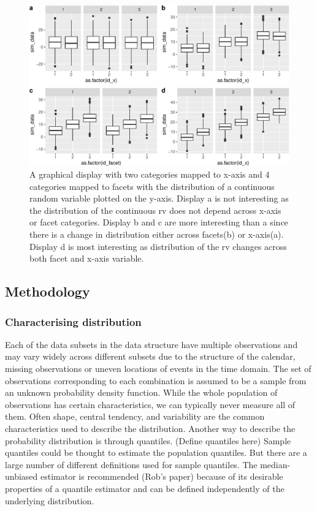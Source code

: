 \documentclass[
]{article}
\begin{document}
\begin{figure}

{\centering \includegraphics[width=\textwidth]{figure/null4by2-1} 

}

\caption{ A graphical display with two categories mapped to x-axis and 4 categories mapped to facets with the distribution of a continuous random variable plotted on the y-axis. Display a is not interesting as the distribution of the continuous rv does not depend across x-axis or facet categories. Display b and c are more interesting than a since there is a change in distribution either across facets(b) or x-axis(a). Display d is most interesting as distribution of the rv changes across both facet and x-axis variable.}\label{fig:null4by2}
\end{figure}

\hypertarget{methodology}{%
\subsection{Methodology}\label{methodology}}

\hypertarget{characterising-distribution}{%
\subsubsection{Characterising distribution}\label{characterising-distribution}}

Each of the data subsets in the data structure have multiple observations and may vary widely across different subsets due to the structure of the calendar, missing observations or uneven locations of events in the time domain. The set of observations corresponding to each combination is assumed to be a sample from an unknown probability density function.
While the whole population of observations has certain characteristics, we can typically never measure all of them. Often shape, central tendency, and variability are the common characteristics used to describe the distribution. Another way to describe the probability distribution is through quantiles. (Define quantiles here) Sample quantiles could be thought to estimate the population quantiles. But there are a large number of different definitions used for sample quantiles. The median-unbiased estimator is recommended (Rob's paper) because of its desirable properties of a quantile estimator and can be defined independently of the underlying distribution.
\end{document}
